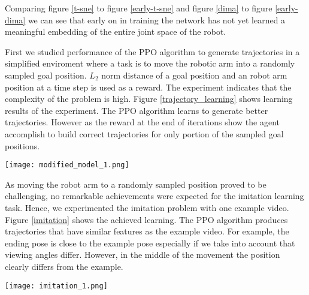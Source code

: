 Comparing figure \ref{t-sne} to figure \ref{early-t-sne} and figure \ref{dima} to figure \ref{early-dima} we can see that early on in training the network has not yet learned a meaningful embedding of the entire joint space of the robot.

First we studied performance of the PPO algorithm to generate trajectories in a simplified enviroment where a task is to move the robotic arm into a randomly sampled goal position. $L_2$ norm distance of a goal position and an robot arm position at a time step is used as a reward. The experiment indicates that the complexity of the problem is high. Figure \ref{trajectory_learning} shows learning results of the experiment. The PPO algorithm learns to generate better trajectories. However as the reward at the end of iterations show the agent accomplish to build correct trajectories for only portion of the sampled goal positions.        

{
    \centering
    \texttt{[image: modified\_model\_1.png]}
    \label{trajectory_learning}
    \vspace{0.25cm}
}

As moving the robot arm to a randomly sampled position proved to be challenging, no remarkable achievements were expected for the imitation learning task. Hence, we experimented the imitation problem with one example video. Figure \ref{imitation} shows the achieved learning. The PPO algorithm produces trajectories that have similar features as the example video. For example, the ending pose is close to the example pose especially if we take into account that viewing angles differ. However, in the middle of the movement the position clearly differs from the example.

{
    \centering
    \texttt{[image: imitation\_1.png]}
    \label{imitation}
    \vspace{0.25cm}
}